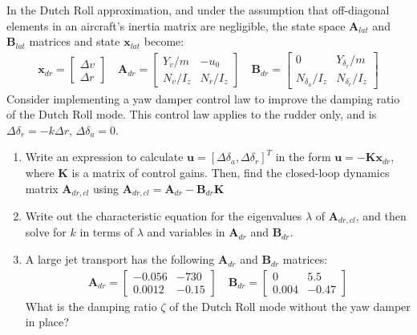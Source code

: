 \begin{question}
    In the Dutch Roll approximation, and under the assumption that off-diagonal elements in an aircraft's inertia matrix are negligible, the state space $\mathbf{A}_{lat}$ and $\mathbf{B}_{lat}$ matrices and state $\mathbf{x}_{lat}$ become:
    \begin{align*}
        \mathbf{x}_{dr} =
        \begin{bmatrix}
            \Delta v \\
            \Delta r
        \end{bmatrix}
        \quad
        \mathbf{A}_{dr} = 
        \begin{bmatrix}
            Y_v/m & -u_0 \\
            N_v/I_z & N_r/I_z
        \end{bmatrix}
        \quad
        \mathbf{B}_{dr} =
        \begin{bmatrix}
            0 & Y_{\delta_r}/m \\
            N_{\delta_a}/I_z & N_{\delta_r}/I_z
        \end{bmatrix}
    \end{align*}
    Consider implementing a yaw damper control law to improve the damping ratio of the Dutch Roll mode. This control law applies to the rudder only, and is $\Delta \delta_r = -k \Delta r$, $\Delta \delta_a = 0$.
    \begin{enumerate}
        \item Write an expression to calculate $\mathbf{u} = [\Delta \delta_a, \Delta \delta_r]^T$ in the form $\mathbf{u} = -\mathbf{K} \mathbf{x}_{dr}$, where $\mathbf{K}$ is a matrix of control gains. Then, find the closed-loop dynamics matrix $\mathbf{A}_{dr,cl}$ using $\mathbf{A}_{dr,cl} = \mathbf{A}_{dr} - \mathbf{B}_{dr} \mathbf{K}$
        \item Write out the characteristic equation for the eigenvalues $\lambda$ of $\mathbf{A}_{dr,cl}$, and then solve for $k$ in terms of $\lambda$ and variables in $\mathbf{A}_{dr}$ and $\mathbf{B}_{dr}$.
        \item A large jet transport has the following $\mathbf{A}_{dr}$ and $\mathbf{B}_{dr}$ matrices:
        \begin{align*}
            \mathbf{A}_{dr} = 
            \begin{bmatrix}
                -0.056 & -730 \\
                0.0012 & -0.15
            \end{bmatrix}
            \quad
            \mathbf{B}_{dr} =
            \begin{bmatrix}
                0 & 5.5 \\
                0.004 & -0.47
            \end{bmatrix}
        \end{align*}
        What is the damping ratio $\zeta$ of the Dutch Roll mode without the yaw damper in place?


\end{enumerate}
\end{question}
